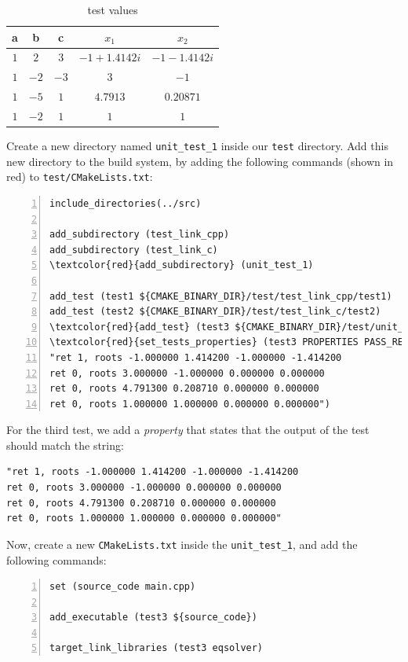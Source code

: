 \documentclass[12pt,a4paper]{article}
\begin{document}
\begin{table}[htdp]
\caption{test values}
\begin{center}
\begin{tabular}{|c|c|c|c|c|}
\hline
a & b & c & $x_{1}$ & $x_{2}$ \\
\hline
$1$ & $2$ & $3$ & $-1+1.4142i$ & $-1-1.4142i$ \\
$1$ & $-2$ & $-3$ & $3$ & $-1$ \\
$1$ & $-5$ & $1$ & $4.7913$ & $0.20871$ \\
$1$ & $-2$ & $1$ & $1$ & $1$\\
\hline 
\end{tabular}
\end{center}
\label{default}
\end{table}%
Create a new directory named \verb+unit_test_1+ inside our \verb+test+ directory. Add this new directory
to the build system, by adding the following commands (shown in red) to \verb+test/CMakeLists.txt+:
\begin{Verbatim}[commandchars=\\\{\}, numbers=left, frame=lines, label=file \texttt{eqsolver/test/CMakeLists.txt}]
include_directories(../src)

add_subdirectory (test_link_cpp) 
add_subdirectory (test_link_c)
\textcolor{red}{add_subdirectory} (unit_test_1)

add_test (test1 ${CMAKE_BINARY_DIR}/test/test_link_cpp/test1)
add_test (test2 ${CMAKE_BINARY_DIR}/test/test_link_c/test2)
\textcolor{red}{add_test} (test3 ${CMAKE_BINARY_DIR}/test/unit_test_1/test3)
\textcolor{red}{set_tests_properties} (test3 PROPERTIES PASS_REGULAR_EXPRESSION  
"ret 1, roots -1.000000 1.414200 -1.000000 -1.414200
ret 0, roots 3.000000 -1.000000 0.000000 0.000000
ret 0, roots 4.791300 0.208710 0.000000 0.000000
ret 0, roots 1.000000 1.000000 0.000000 0.000000")

\end{Verbatim}
For the third test, we add a \emph{property} that states that the output of the test should match the string:
\begin{Verbatim}
"ret 1, roots -1.000000 1.414200 -1.000000 -1.414200
ret 0, roots 3.000000 -1.000000 0.000000 0.000000
ret 0, roots 4.791300 0.208710 0.000000 0.000000
ret 0, roots 1.000000 1.000000 0.000000 0.000000"
\end{Verbatim}

Now, create a new \verb+CMakeLists.txt+ inside the \verb+unit_test_1+, and add the following commands:
\begin{Verbatim}[numbers=left, frame=lines, label=file \texttt{eqsolver/test/unit\_test\_1/CMakeLists.txt}]
set (source_code main.cpp)

add_executable (test3 ${source_code})

target_link_libraries (test3 eqsolver)
\end{Verbatim}
\end{document}
